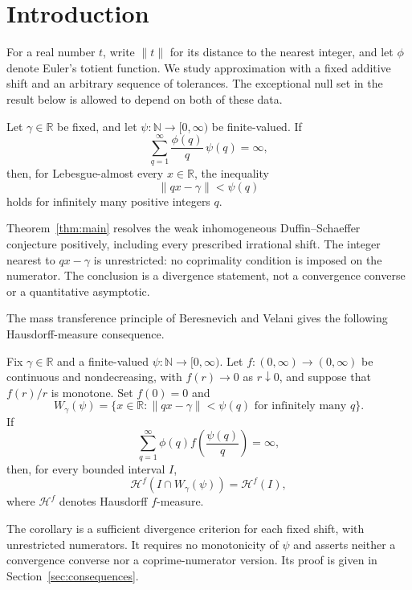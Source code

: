 \section{Introduction}\label{sec:introduction}

For a real number $t$, write $\|t\|$ for its distance to the nearest
integer, and let $\phi$ denote Euler's totient function. We study
approximation with a fixed additive shift and an arbitrary sequence of
tolerances. The exceptional null set in the result below is allowed to
depend on both of these data.

\begin{theorem}
\label{thm:main}
Let $\gamma\in\mathbb R$ be fixed, and let
$\psi:\mathbb N\to[0,\infty)$ be finite-valued. If
\begin{equation}\label{eq:main-divergence}
  \sum_{q=1}^{\infty}\frac{\phi(q)}q\,\psi(q)=\infty,
\end{equation}
then, for Lebesgue-almost every $x\in\mathbb R$, the inequality
\[
  \|qx-\gamma\|<\psi(q)
\]
holds for infinitely many positive integers $q$.
\end{theorem}

Theorem~\ref{thm:main} resolves the weak inhomogeneous Duffin--Schaeffer
conjecture positively, including every prescribed irrational shift.
The integer nearest to $qx-\gamma$ is unrestricted: no coprimality
condition is imposed on the numerator. The conclusion is a divergence
statement, not a convergence converse or a quantitative asymptotic.

The mass transference principle of Beresnevich and Velani gives the
following Hausdorff-measure consequence.

\begin{corollary}\label{cor:hausdorff}
Fix $\gamma\in\mathbb R$ and a finite-valued
$\psi:\mathbb N\to[0,\infty)$. Let
$f:(0,\infty)\to(0,\infty)$ be continuous and nondecreasing, with
$f(r)\to0$ as $r\downarrow0$, and suppose that $f(r)/r$ is monotone.
Set $f(0)=0$ and
\[
  W_\gamma(\psi)=\{x\in\mathbb R:
    \|qx-\gamma\|<\psi(q)\text{ for infinitely many }q\}.
\]
If
\[
  \sum_{q=1}^{\infty}\phi(q)f\!\left(\frac{\psi(q)}q\right)=\infty,
\]
then, for every bounded interval $I$,
\[
  \mathcal H^f(I\cap W_\gamma(\psi))=\mathcal H^f(I),
\]
where $\mathcal H^f$ denotes Hausdorff $f$-measure.
\end{corollary}

The corollary is a sufficient divergence criterion for each fixed
shift, with unrestricted numerators. It requires no monotonicity of
$\psi$ and asserts neither a convergence converse nor a coprime-numerator
version. Its proof is given in Section~\ref{sec:consequences}.

